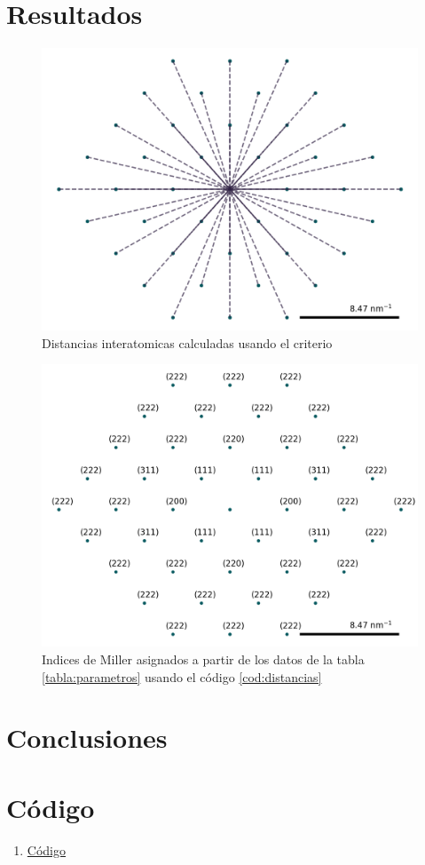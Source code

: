 \documentclass[reprint,amsmath,amssymb,aps,]{revtex4-2}
\begin{document}
\section{Resultados}
\begin{figure}[H]
    \centering
    \includegraphics[scale=0.4]{../Graphics/distancia.png}
    \caption{Distancias interatomicas calculadas usando el criterio }
    \label{fig:distancias}
\end{figure}
\begin{figure}[H]
    \centering
    \includegraphics[scale=0.4]{../Graphics/indices.png}
    \caption{Indices de Miller asignados a partir de los datos de la tabla \ref{tabla:parametros} usando el código \ref{cod:distancias}}
    \label{fig:indicesmiller}
\end{figure}
\section{Conclusiones}
\section{Código}
\begin{enumerate}
    \item \href{aa}{Código \label{cod:distancias}}
\end{enumerate}

\nocite{*}

\end{document}
